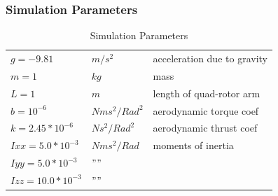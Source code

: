\documentclass{beamer}
\begin{document}
\begin{frame}
\frametitle{Simulation Parameters}

\begin{table}
\centering
\begin{tabular}{l l l}
    \hline
    $g = -9.81                  $& $     m / s^2                        $ & acceleration due to gravity\\
    $m = 1                       $& $     kg                                $ & mass\\
    $L = 1                         $& $    m                                 $ & length of quad-rotor arm\\
    $b = 10^{-6}             $& $    N m s^2  / Rad^2       $ & aerodynamic torque coef\\
    $k = 2.45*10^{-6}     $& $   N s^2 / Rad^2            $ & aerodynamic thrust coef\\
    $Ixx = 5.0*10^{-3}    $& $   N m s^2 / Rad            $ & moments of inertia \\
    $Iyy = 5.0*10^{-3}    $& $   ""                                 $ & \\
    $Izz = 10.0*10^{-3}   $& $   ""                                 $ & \\
    \hline
\end{tabular}
\caption[Simulation Parameters]{Simulation Parameters}
\end{table}

\end{frame}




\end{document}
